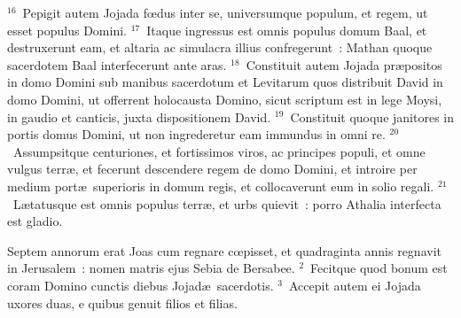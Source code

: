 ${}^{16}$~Pepigit autem Jojada fœdus inter se, universumque populum, et regem, ut esset populus Domini.
${}^{17}$~Itaque ingressus est omnis populus domum Baal, et destruxerunt eam, et altaria ac simulacra illius confregerunt~: Mathan quoque sacerdotem Baal interfecerunt ante aras.
${}^{18}$~Constituit autem Jojada pr\ae positos in domo Domini sub manibus sacerdotum et Levitarum quos distribuit David in domo Domini, ut offerrent holocausta Domino, sicut scriptum est in lege Moysi, in gaudio et canticis, juxta dispositionem David.
${}^{19}$~Constituit quoque janitores in portis domus Domini, ut non ingrederetur eam immundus in omni re.
${}^{20}$~Assumpsitque centuriones, et fortissimos viros, ac principes populi, et omne vulgus terr\ae , et fecerunt descendere regem de domo Domini, et introire per medium port\ae\ superioris in domum regis, et collocaverunt eum in solio regali.
${}^{21}$~L\ae tatusque est omnis populus terr\ae , et urbs quievit~: porro Athalia interfecta est gladio.

\bchapter
\lettrine[lines=3,image=true,loversize=0.05,lraise=-0.03]{S}{}eptem annorum erat Joas cum regnare cœpisset, et quadraginta annis regnavit in Jerusalem~: nomen matris ejus Sebia de Bersabee.
${}^{2}$~Fecitque quod bonum est coram Domino cunctis diebus Jojad\ae\ sacerdotis.
${}^{3}$~Accepit autem ei Jojada uxores duas, e quibus genuit filios et filias.


